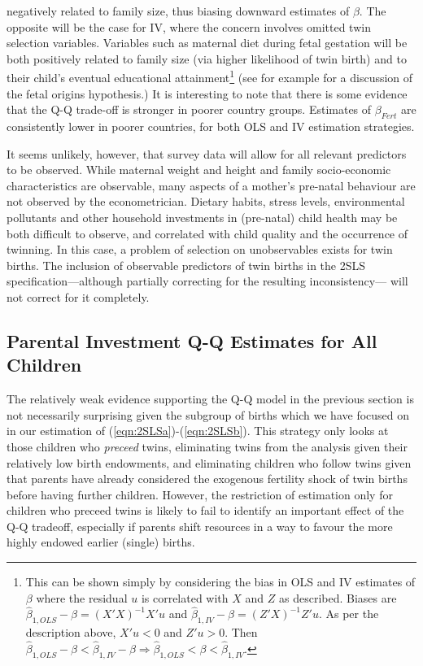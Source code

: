 \documentclass{article}[11pt,subeqn]
\begin{document}
\begin{spacing}{1.5}
\noindent negatively related to family size, thus biasing downward estimates of $\beta$.  The opposite will be 
the case for IV, where the concern involves omitted twin selection variables.  Variables such as maternal diet during fetal gestation will be both positively related to 
family size (via higher likelihood of twin birth) and to their child's eventual educational attainment\footnote{This can be shown simply by considering the bias in OLS and IV
estimates of $\beta$ where the residual $u$ is correlated with $X$ and $Z$ as described.  Biases are $\hat{\beta}_{1,OLS}-\beta=(X'X)^{-1}X'u$ and $\hat{\beta}_{1,IV}-\beta=(Z'X)^{-1}Z'u$.
As per the description above, $X'u<0$ and $Z'u>0$.  Then $\hat{\beta}_{1,OLS}-\beta<\hat{\beta}_{1,IV}-\beta\Rightarrow\hat{\beta}_{1,OLS}<\beta<\hat{\beta}_{1,IV}$.}
 (see for example \citet{Barker1995} for a discussion of the fetal origins 
hypothesis.)  It is interesting to note that there is some evidence that the Q-Q trade-off is stronger in poorer country groups.  Estimates of $\beta_{Fert}$ are 
consistently lower in poorer countries, for both OLS and IV estimation strategies.  

It seems unlikely, however, that survey data will allow for all relevant predictors to be observed.  While maternal weight and height and family socio-economic 
characteristics are observable, many aspects of a mother's pre-natal behaviour are not observed by the econometrician.  Dietary habits, stress levels, environmental 
pollutants and other household investments in (pre-natal) child health may be both difficult to observe, and correlated with child quality and the occurrence of 
twinning.  In this case, a problem of selection on unobservables exists for twin births.  The inclusion of observable predictors of twin births in the 2SLS 
specification---although partially correcting for the resulting inconsistency--- will not correct for it completely.


\subsection{Parental Investment Q-Q Estimates for All Children}
\label{scn:RZway}
The relatively weak evidence supporting the Q-Q model in the previous section is not necessarily surprising given the subgroup of births
which we have focused on in our estimation of (\ref{eqn:2SLSa})-(\ref{eqn:2SLSb}).  This strategy only looks at those children who 
\emph{preceed} twins, eliminating twins from the analysis given their relatively low birth endowments, and eliminating children who
follow twins given that parents have already considered the exogenous fertility shock of twin births before having further children.  
However, the restriction of estimation only for children who preceed twins is likely to fail to identify an important effect of the Q-Q 
tradeoff, especially if parents shift resources in a way to favour the more highly endowed earlier (single) births.


\end{spacing}
\end{document}

